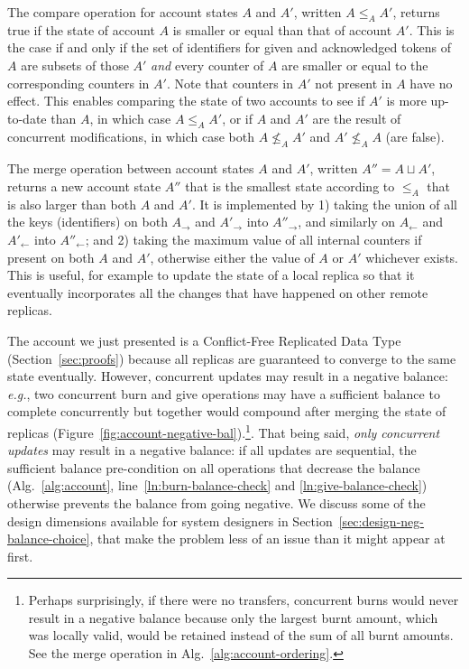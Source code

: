 \documentclass[9pt, oneside]{article}   	%
\begin{document}
The compare operation for account states $A$ and $A'$, written $A \leq_A  A'$, returns true if the state of account $A$ is smaller or equal than that of account $A'$. This is the case if and only if the set of identifiers for given and acknowledged tokens of $A$ are subsets of those $A'$ \textit{and} every counter of $A$ are smaller or equal to the corresponding counters in $A'$. Note that counters in $A'$ not present in $A$ have no effect. This enables comparing the state of two accounts to see if $A'$ is more up-to-date than $A$, in which case $A \leq_A  A'$, or if $A$ and $A'$ are the result of concurrent modifications, in which case both $A \nleq_A A'$ and $A' \nleq_A A$ (are false).

The merge operation between account states $A$ and $A'$, written $A'' = A \sqcup A'$, returns a new account state $A''$ that is the smallest state according to $\leq_A$ that is also larger than both $A$ and $A'$. It is implemented by 1) taking the union of all the keys (identifiers) on both $A_\rightarrow$ and $A'_\rightarrow$ into $A''_\rightarrow$, and similarly on $A_\leftarrow$ and $A'_\leftarrow$ into $A''_\leftarrow$; and 2) taking the maximum value of all internal counters if present on both $A$ and $A'$, otherwise either the value of $A$ or $A'$ whichever exists. This is useful, for example to update the state of a local replica so that it eventually incorporates all the changes that have happened on other remote replicas.

The account we just presented is a Conflict-Free Replicated Data Type~\cite{shapiro:hal-00932836} (Section~\ref{sec:proofs}) because all replicas are guaranteed to converge to the same state eventually. However, concurrent updates may result in a negative balance: \textit{e.g.}, two concurrent burn and give operations may have a sufficient balance to complete concurrently but together would compound after merging the state of replicas  (Figure~\ref{fig:account-negative-bal}).\footnote{Perhaps surprisingly, if there were no transfers, concurrent burns would never result in a negative balance because only the largest burnt amount, which was locally valid, would be retained instead of the sum of all burnt amounts. See the merge operation in Alg.~\ref{alg:account-ordering}.}. That being said, \textit{only concurrent updates} may result in a negative balance: if all updates are sequential, the sufficient balance pre-condition on all operations that decrease the balance (Alg.~\ref{alg:account}, line~\ref{ln:burn-balance-check} and \ref{ln:give-balance-check}) otherwise prevents the balance from going negative. We discuss some of the design dimensions available for system designers in Section~\ref{sec:design-neg-balance-choice}, that make the problem less of an issue than it might appear at first.
\end{document}
